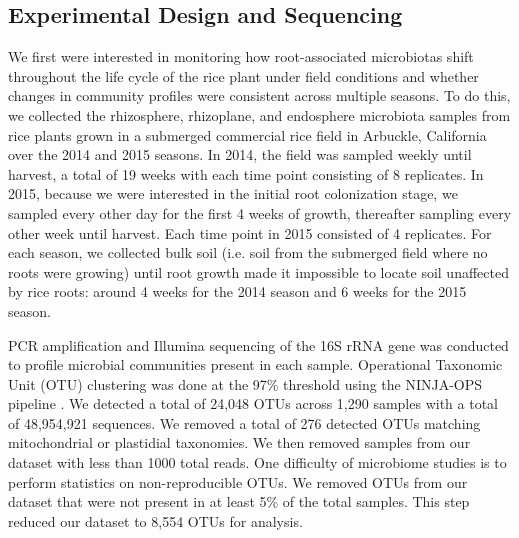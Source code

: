 \subsection{Experimental Design and Sequencing}
We first were interested in monitoring how root-associated microbiotas shift throughout the life cycle of the rice plant under field conditions and whether changes in community profiles were consistent across multiple seasons. To do this, we collected the rhizosphere, rhizoplane, and endosphere microbiota samples from rice plants grown in a submerged commercial rice field in Arbuckle, California over the 2014 and 2015 seasons. In 2014, the field was sampled weekly until harvest, a total of 19 weeks with each time point consisting of 8 replicates. In 2015, because we were interested in the initial root colonization stage, we sampled every other day for the first 4 weeks of growth, thereafter sampling every other week until harvest. Each time point in 2015 consisted of 4 replicates. For each season, we collected bulk soil (i.e. soil from the submerged field where no roots were growing) until root growth made it impossible to locate soil unaffected by rice roots: around 4 weeks for the 2014 season and 6 weeks for the 2015 season.

PCR amplification and Illumina sequencing of the 16S rRNA gene was conducted to profile microbial communities present in each sample. Operational Taxonomic Unit (OTU) clustering was done at the 97\% threshold using the NINJA-OPS pipeline \cite{Al-Ghalith2016}. We detected a total of 24,048 OTUs across 1,290 samples with a total of 48,954,921 sequences. We removed a total of 276 detected OTUs matching mitochondrial or plastidial taxonomies. We then removed samples from our dataset with less than 1000 total reads. One difficulty of microbiome studies is to perform statistics on non-reproducible OTUs. We removed OTUs from our dataset that were not present in at least 5\% of the total samples. This step reduced our dataset to 8,554 OTUs for analysis.

